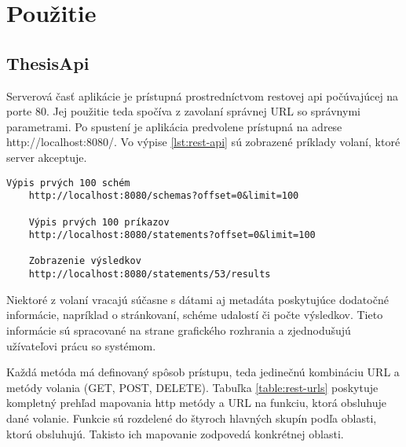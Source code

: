 \section{Použitie}

	\subsection{ThesisApi}
	Serverová časť aplikácie je prístupná prostredníctvom restovej api počúvajúcej na porte 80. Jej použitie teda spočíva z zavolaní správnej URL so správnymi parametrami. Po spustení je aplikácia predvolene prístupná na adrese http://localhost:8080/. Vo výpise \ref{lst:rest-api} sú zobrazené príklady volaní, ktoré server akceptuje.

	\begin{lstlisting}[label=lst:rest-api,caption=Príklad volaní REST API]
	Výpis prvých 100 schém
	http://localhost:8080/schemas?offset=0&limit=100
	
	Výpis prvých 100 príkazov
	http://localhost:8080/statements?offset=0&limit=100
	
	Zobrazenie výsledkov
	http://localhost:8080/statements/53/results
	\end{lstlisting}
	
	Niektoré z volaní vracajú súčasne s dátami aj metadáta poskytujúce dodatočné informácie, napríklad o stránkovaní, schéme udalostí či počte výsledkov. Tieto informácie sú spracované na strane grafického rozhrania a zjednodušujú užívateľovi prácu so systémom.
	
	Každá metóda má definovaný spôsob prístupu, teda jedinečnú kombináciu URL a metódy volania (GET, POST, DELETE). Tabuľka \ref{table:rest-urls} poskytuje kompletný prehľad mapovania http metódy a URL na funkciu, ktorá obsluhuje dané volanie.	Funkcie sú rozdelené do štyroch hlavných skupín podľa oblasti, ktorú obsluhujú. Takisto ich mapovanie zodpovedá konkrétnej oblasti.
	
